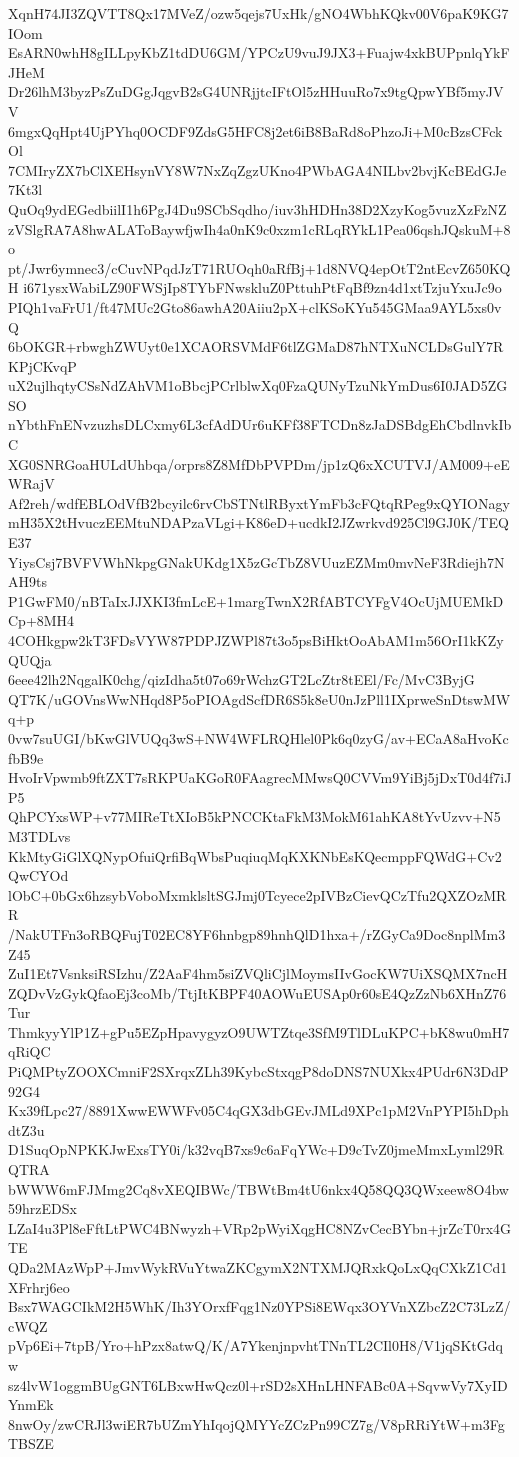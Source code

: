 XqnH74JI3ZQVTT8Qx17MVeZ/ozw5qejs7UxHk/gNO4WbhKQkv00V6paK9KG7IOom
EsARN0whH8gILLpyKbZ1tdDU6GM/YPCzU9vuJ9JX3+Fuajw4xkBUPpnlqYkFJHeM
Dr26lhM3byzPsZuDGgJqgvB2sG4UNRjjtcIFtOl5zHHuuRo7x9tgQpwYBf5myJVV
6mgxQqHpt4UjPYhq0OCDF9ZdsG5HFC8j2et6iB8BaRd8oPhzoJi+M0cBzsCFckOl
7CMIryZX7bClXEHsynVY8W7NxZqZgzUKno4PWbAGA4NILbv2bvjKcBEdGJe7Kt3l
QuOq9ydEGedbiilI1h6PgJ4Du9SCbSqdho/iuv3hHDHn38D2XzyKog5vuzXzFzNZ
zVSlgRA7A8hwALAToBaywfjwIh4a0nK9c0xzm1cRLqRYkL1Pea06qshJQskuM+8o
pt/Jwr6ymnec3/cCuvNPqdJzT71RUOqh0aRfBj+1d8NVQ4epOtT2ntEcvZ650KQH
i671ysxWabiLZ90FWSjIp8TYbFNwskluZ0PttuhPtFqBf9zn4d1xtTzjuYxuJc9o
PIQh1vaFrU1/ft47MUc2Gto86awhA20Aiiu2pX+clKSoKYu545GMaa9AYL5xs0vQ
6bOKGR+rbwghZWUyt0e1XCAORSVMdF6tlZGMaD87hNTXuNCLDsGulY7RKPjCKvqP
uX2ujlhqtyCSsNdZAhVM1oBbcjPCrlblwXq0FzaQUNyTzuNkYmDus6I0JAD5ZGSO
nYbthFnENvzuzhsDLCxmy6L3cfAdDUr6uKFf38FTCDn8zJaDSBdgEhCbdlnvkIbC
XG0SNRGoaHULdUhbqa/orprs8Z8MfDbPVPDm/jp1zQ6xXCUTVJ/AM009+eEWRajV
Af2reh/wdfEBLOdVfB2bcyilc6rvCbSTNtlRByxtYmFb3cFQtqRPeg9xQYIONagy
mH35X2tHvuczEEMtuNDAPzaVLgi+K86eD+ucdkI2JZwrkvd925Cl9GJ0K/TEQE37
YiysCsj7BVFVWhNkpgGNakUKdg1X5zGcTbZ8VUuzEZMm0mvNeF3Rdiejh7NAH9ts
P1GwFM0/nBTaIxJJXKI3fmLcE+1margTwnX2RfABTCYFgV4OcUjMUEMkDCp+8MH4
4COHkgpw2kT3FDsVYW87PDPJZWPl87t3o5psBiHktOoAbAM1m56OrI1kKZyQUQja
6eee42lh2NqgalK0chg/qizIdha5t07o69rWchzGT2LcZtr8tEEl/Fc/MvC3ByjG
QT7K/uGOVnsWwNHqd8P5oPIOAgdScfDR6S5k8eU0nJzPll1IXprweSnDtswMWq+p
0vw7suUGI/bKwGlVUQq3wS+NW4WFLRQHlel0Pk6q0zyG/av+ECaA8aHvoKcfbB9e
HvoIrVpwmb9ftZXT7sRKPUaKGoR0FAagrecMMwsQ0CVVm9YiBj5jDxT0d4f7iJP5
QhPCYxsWP+v77MIReTtXIoB5kPNCCKtaFkM3MokM61ahKA8tYvUzvv+N5M3TDLvs
KkMtyGiGlXQNypOfuiQrfiBqWbsPuqiuqMqKXKNbEsKQecmppFQWdG+Cv2QwCYOd
lObC+0bGx6hzsybVoboMxmklsltSGJmj0Tcyece2pIVBzCievQCzTfu2QXZOzMRR
/NakUTFn3oRBQFujT02EC8YF6hnbgp89hnhQlD1hxa+/rZGyCa9Doc8nplMm3Z45
ZuI1Et7VsnksiRSIzhu/Z2AaF4hm5siZVQliCjlMoymsIIvGocKW7UiXSQMX7ncH
ZQDvVzGykQfaoEj3coMb/TtjItKBPF40AOWuEUSAp0r60sE4QzZzNb6XHnZ76Tur
ThmkyyYlP1Z+gPu5EZpHpavygyzO9UWTZtqe3SfM9TlDLuKPC+bK8wu0mH7qRiQC
PiQMPtyZOOXCmniF2SXrqxZLh39KybcStxqgP8doDNS7NUXkx4PUdr6N3DdP92G4
Kx39fLpc27/8891XwwEWWFv05C4qGX3dbGEvJMLd9XPc1pM2VnPYPI5hDphdtZ3u
D1SuqOpNPKKJwExsTY0i/k32vqB7xs9c6aFqYWc+D9cTvZ0jmeMmxLyml29RQTRA
bWWW6mFJMmg2Cq8vXEQIBWc/TBWtBm4tU6nkx4Q58QQ3QWxeew8O4bw59hrzEDSx
LZaI4u3Pl8eFftLtPWC4BNwyzh+VRp2pWyiXqgHC8NZvCecBYbn+jrZcT0rx4GTE
QDa2MAzWpP+JmvWykRVuYtwaZKCgymX2NTXMJQRxkQoLxQqCXkZ1Cd1XFrhrj6eo
Bsx7WAGCIkM2H5WhK/Ih3YOrxfFqg1Nz0YPSi8EWqx3OYVnXZbcZ2C73LzZ/cWQZ
pVp6Ei+7tpB/Yro+hPzx8atwQ/K/A7YkenjnpvhtTNnTL2CIl0H8/V1jqSKtGdqw
sz4lvW1oggmBUgGNT6LBxwHwQcz0l+rSD2sXHnLHNFABc0A+SqvwVy7XyIDYnmEk
8nwOy/zwCRJl3wiER7bUZmYhIqojQMYYcZCzPn99CZ7g/V8pRRiYtW+m3FgTBSZE
